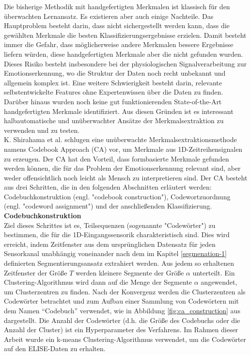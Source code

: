 Die bisherige Methodik mit handgefertigten Merkmalen ist klassisch für den überwachten Lernansatz. 
Es existieren aber auch einige Nachteile. 
Das Hauptproblem besteht darin, dass nicht sichergestellt werden kann, dass die gewählten Merkmale die besten Klassifizierungsergebnisse erzielen. Damit besteht immer die Gefahr, dass möglicherweise andere Merkmalen bessere Ergebnisse liefern würden, diese handgefertigten Merkmale aber die  nicht gefunden wurden. Dieses Risiko besteht insbesondere bei der physiologischen Signalverarbeitung zur Emotionserkennung, wo die Struktur der Daten noch recht unbekannt und allgemein komplex ist. 
Eine weitere Schwierigkeit besteht darin, relevante selbstentwickelte Features ohne Expertenwissen über die Daten zu finden.
Darüber hinaus wurden noch keine gut funktionierenden State-of-the-Art handgefertigten Merkmale identifiziert.
Aus diesen Gründen ist es interessant halbautomatische und unüberwachter Ansätze der Merkmalsextraktion zu verwenden und zu testen. \\


K. Shirahama et al. \cite{kimiaki_codebook_approach_2016} schlugen eine unüberwachte Merkmalsextraktionsmethode namens Codebook Approach (CA) vor, um Merkmale aus 1D-Zeitreihensignalen zu erzeugen.
Der CA hat den Vorteil, dass formbasierte Merkmale gefunden werden können, die für das Problem der Emotionserkennung relevant sind, aber weder offensichtlich noch leicht als Mensch zu interpretieren sind. 
Der CA besteht aus drei Schritten, die in den folgenden Abschnitten erläutert werden: Codebuchkonstruktion (engl. "codebook construction"), Codewortzuordnung (engl. "codeword assignment") und der anschließenden Klassifizierung. \\


\textbf{Codebuchkonstruktion \\}
Ziel dieses Schrittes ist es, Teilsequenzen (sogenannte "Codewörter") zu bestimmen, die für die 1D-Eingangssensorik charakteristisch sind. 
Dies wird erreicht, indem Zeitfenster aus dem ursprünglichen Datensatz für jeden Sensorkanal unabhängig voneinander nach dem im Kapitel \ref{segmenation-1} definierten Segmentierungsansatz extrahiert werden.
Aus jedem so erhaltenen Zeitfenster der Größe $T$ werden kleinere Segmente der Größe $\alpha$ unterteilt.
Ein Clustering-Algorithmus wird dann auf die Menge der Segmente $\alpha$ angewendet, um Clusterzentren zu finden.
Nach der Konvergenz werden die Clusterzentren als Codewörter betrachtet und zum Aufbau einer Sammlung von Codewörtern mit dem Namen ``Codebuch'' verwendet, wie in Abbildung \ref{fig:ca_construction} aus \cite{kimiaki_codebook_approach_2016} dargestellt. 
Die Anzahl der Codewörter (d.h. die Größe des Codebuchs oder die Anzahl der Cluster) ist ein Hyperparameter des Verfahrens. Im Rahmen dieser Arbeit wurde ein k-means Clustering-Algorithmus verwendet, um die Codewörter auf den ELISE-Daten zu erhalten. \\


